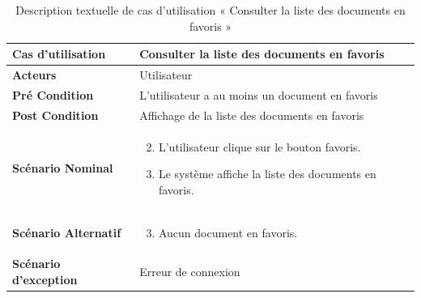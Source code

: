 \begin{longtable}{|p{5cm}|p{10cm}|}
  \caption{Description textuelle de cas d'utilisation « Consulter la liste des documents en favoris  »} \label{tab:DescriptionTextuelleDeCasDUtilisationConsulterLaListeDesDocumentsEnFavoris} \\
\hline
\textbf{Cas d'utilisation}&Consulter la liste des documents en favoris\\
\hline
\textbf{Acteurs}&Utilisateur\\
\hline
\textbf{Pré Condition}&L'utilisateur a au moins un document en favoris\\
\hline
\textbf{Post Condition}&Affichage de la liste des documents en favoris\\
\hline
\textbf{Scénario Nominal}&
\vspace{-\baselineskip}
\begin{enumerate}
    \setcounter{enumi}{1}
    \item L'utilisateur clique sur le bouton favoris.
    \item Le système affiche la liste des documents en favoris.
\end{enumerate}\\
\hline
\textbf{Scénario Alternatif}&
\vspace{-\baselineskip}
\begin{enumerate}
    \setcounter{enumi}{2}
    \item Aucun document en favoris.
\end{enumerate}\\
\hline
\textbf{Scénario d'exception}&Erreur de connexion\\
\hline

\end{longtable}





